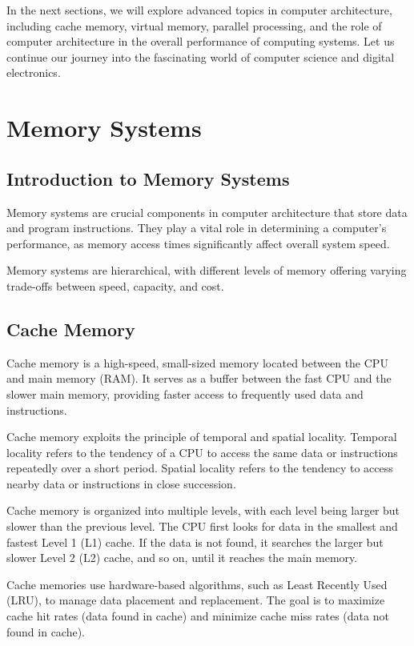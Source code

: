 \documentclass{article}
\begin{document}
In the next sections, we will explore advanced topics in computer architecture, including cache memory, virtual memory, parallel processing, and the role of computer architecture in the overall performance of computing systems. Let us continue our journey into the fascinating world of computer science and digital electronics.

\newpage

\section{Memory Systems}

\subsection{Introduction to Memory Systems}

Memory systems are crucial components in computer architecture that store data and program instructions. They play a vital role in determining a computer's performance, as memory access times significantly affect overall system speed.

Memory systems are hierarchical, with different levels of memory offering varying trade-offs between speed, capacity, and cost.

\subsection{Cache Memory}

Cache memory is a high-speed, small-sized memory located between the CPU and main memory (RAM). It serves as a buffer between the fast CPU and the slower main memory, providing faster access to frequently used data and instructions.

Cache memory exploits the principle of temporal and spatial locality. Temporal locality refers to the tendency of a CPU to access the same data or instructions repeatedly over a short period. Spatial locality refers to the tendency to access nearby data or instructions in close succession.

Cache memory is organized into multiple levels, with each level being larger but slower than the previous level. The CPU first looks for data in the smallest and fastest Level 1 (L1) cache. If the data is not found, it searches the larger but slower Level 2 (L2) cache, and so on, until it reaches the main memory.

Cache memories use hardware-based algorithms, such as Least Recently Used (LRU), to manage data placement and replacement. The goal is to maximize cache hit rates (data found in cache) and minimize cache miss rates (data not found in cache).
\end{document}
